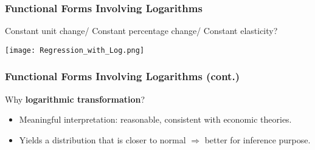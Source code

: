 \documentclass[11pt, xcolor=x11names,compress]{beamer}
\begin{document}
\begin{frame}[fragile,t]
\frametitle{Functional Forms Involving Logarithms}\label{log-level}
Constant unit change/ Constant percentage change/ Constant elasticity?
\begin{center}
    \texttt{[image: Regression\_with\_Log.png]}
\end{center}
\end{frame}

\begin{frame}[fragile,t]
\frametitle{Functional Forms Involving Logarithms (cont.)}
Why \textbf{logarithmic transformation}?
\vspace{3mm}
\begin{itemize}
    \item Meaningful interpretation: reasonable, consistent with economic theories.
    \vspace{3mm}
    \item Yields a distribution that is closer to normal $\Longrightarrow$ better for inference purpose.
\end{itemize}
\hyperlink{d)}{}
\end{frame}

\end{document}
